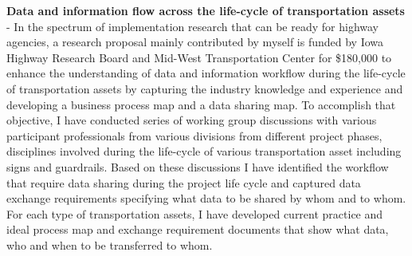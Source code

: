 \documentclass[a4paper,11pt]{article}
\begin{document}
%
%
\par
{\bf Data and information flow across the life-cycle of transportation assets} - In the spectrum of implementation research that can be ready for highway agencies, a research proposal mainly contributed by myself is funded by Iowa Highway Research Board and Mid-West Transportation Center for \$180,000 to enhance the understanding of data and information workflow during the life-cycle of transportation assets by capturing the industry knowledge and experience and developing a business process map and a data sharing map.
%
To accomplish that objective, I have conducted series of working group discussions with various participant professionals from various divisions from different project phases, disciplines involved during the life-cycle of various transportation asset including signs and guardrails.
%
Based on these discussions I have identified the workflow that require data sharing during the project life cycle and captured data exchange requirements specifying what data to be shared by whom and to whom.
%
For each type of transportation assets, I have developed current practice and ideal process map and exchange requirement documents that show what data, who and when to be transferred to whom.
%
%
\end{document}
